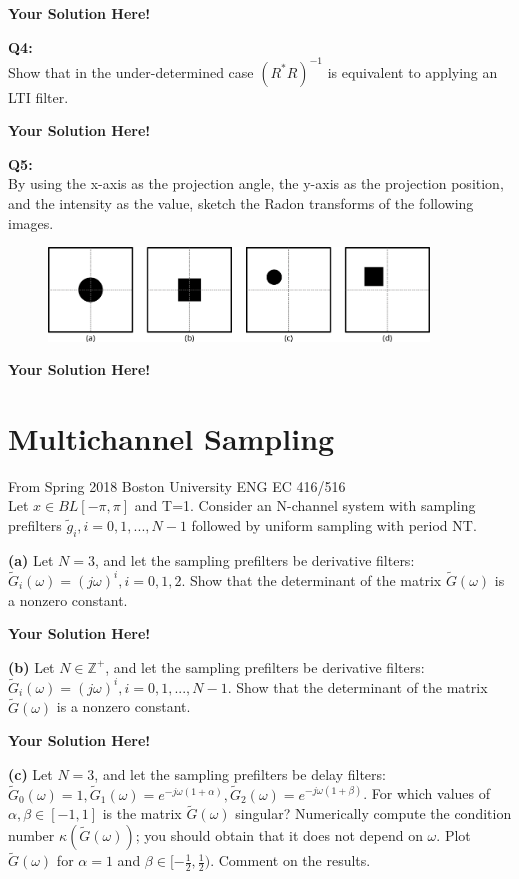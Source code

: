 \documentclass[12pt]{article}
\newcommand{\0}{\mathbf{0}}
\newcommand{\1}{\mathbf{1}}
\newcommand{\solspace}{\vspace{3mm} \textbf{Your Solution Here!} \vspace{3mm}}
\begin{document}
\solspace

\textbf{Q4:}\\
Show that in the under-determined case $(R^* R)^{-1}$ is equivalent to applying an LTI filter.

\solspace

\textbf{Q5:}\\
By using the x-axis as the projection angle, the y-axis as the projection position, and the intensity as the value, sketch the Radon transforms of the following images.
\begin{figure}[h]
    \centering
    \includegraphics[width=0.9\textwidth]{radonQ.png}
\end{figure}

\solspace

\pagebreak
\section{Multichannel Sampling}
From Spring 2018 Boston University ENG EC 416/516\\

Let $x\in BL[-\pi,\pi]$ and T=1. Consider an N-channel system with sampling prefilters $\tilde g_i, i= 0,1,...,N-1$ followed by uniform sampling with period NT.

\textbf{(a)} Let $N=3$, and let the sampling prefilters be derivative filters: $\tilde G_i(\omega) = (j\omega)^i, i = 0,1,2$. Show that the determinant of the matrix $\tilde G(\omega)$ is a nonzero constant.

\solspace

\textbf{(b)} Let $N \in \mathbb{Z}^+$, and let the sampling prefilters be derivative filters: $\tilde G_i(\omega) = (j\omega)^i, i = 0,1,...,N-1$. Show that the determinant of the matrix $\tilde G(\omega)$ is a nonzero constant.

\solspace

\textbf{(c)} Let $N=3$, and let the sampling prefilters be delay filters: $\tilde G_0(\omega) = 1, \tilde G_1(\omega) = e^{-j\omega(1+\alpha)}, \tilde G_2(\omega) = e^{-j\omega(1+\beta)}$. For which values of $\alpha, \beta \in [-1,1]$ is the matrix $\tilde G(\omega)$ singular? Numerically compute the condition number $\kappa(\tilde G(\omega))$; you should obtain that it does not depend on $\omega$. Plot $\tilde G(\omega)$ for $\alpha = 1$ and $\beta \in [-\frac{1}{2},\frac{1}{2})$. Comment on the results.
\end{document}
